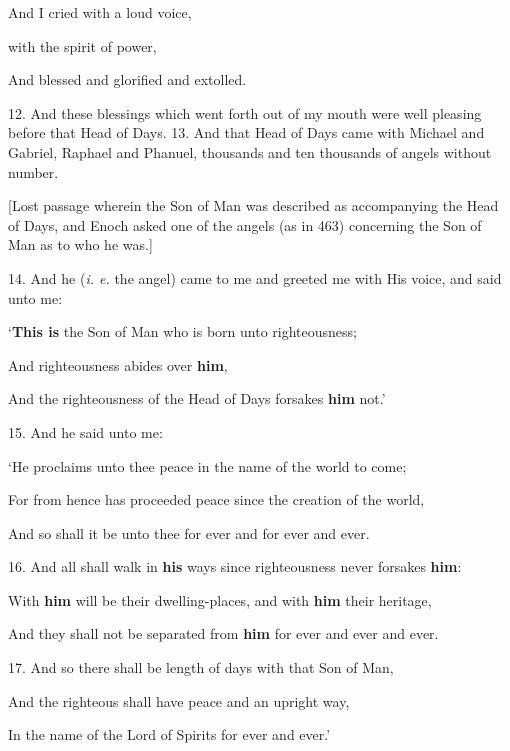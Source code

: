 And I cried with a loud voice,

with the spirit of power,

And blessed and glorified and extolled.

12. And these blessings which went forth out of
my mouth were well pleasing before that Head of
Days. 13. And that Head of Days came with Michael
and Gabriel, Raphael and Phanuel, thousands and
ten thousands of angels without number.

[Lost passage wherein the Son of Man was described as
accompanying the Head of Days, and Enoch asked one of
the angels (as in 463) concerning the Son of Man as to who
he was.]

14. And he (\emph{i. e.} the angel) came to me and greeted
me with His voice, and said unto me:

‘\textbf{This is} the Son of Man who is born unto righteousness;

And righteousness abides over \textbf{him},

And the righteousness of the Head of Days forsakes \textbf{him} not.’

15. And he said unto me:

‘He proclaims unto thee peace in the name of the world to come;

For from hence has proceeded peace since the creation of the world,

And so shall it be unto thee for ever and for ever and ever.

16. And all shall walk in \textbf{his} ways since righteousness never forsakes \textbf{him}:

With \textbf{him} will be their dwelling-places, and with \textbf{him} their heritage,

And they shall not be separated from \textbf{him} for ever and ever and ever.

17. And so there shall be length of days with that Son of Man,

And the righteous shall have peace and an upright way,

In the name of the Lord of Spirits for ever and ever.’



